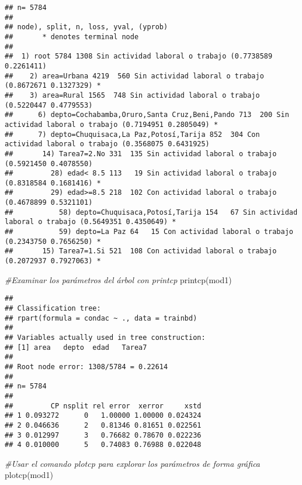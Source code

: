 \documentclass[
]{article}
\newenvironment{Shaded}{\begin{snugshade}}{\end{snugshade}}
\newcommand{\CommentTok}[1]{\textcolor[rgb]{0.56,0.35,0.01}{\textit{#1}}}
\newcommand{\FunctionTok}[1]{\textcolor[rgb]{0.00,0.00,0.00}{#1}}
\newcommand{\NormalTok}[1]{#1}
\begin{document}
\begin{verbatim}
## n= 5784 
## 
## node), split, n, loss, yval, (yprob)
##       * denotes terminal node
## 
##  1) root 5784 1308 Sin actividad laboral o trabajo (0.7738589 0.2261411)  
##    2) area=Urbana 4219  560 Sin actividad laboral o trabajo (0.8672671 0.1327329) *
##    3) area=Rural 1565  748 Sin actividad laboral o trabajo (0.5220447 0.4779553)  
##      6) depto=Cochabamba,Oruro,Santa Cruz,Beni,Pando 713  200 Sin actividad laboral o trabajo (0.7194951 0.2805049) *
##      7) depto=Chuquisaca,La Paz,Potosí,Tarija 852  304 Con actividad laboral o trabajo (0.3568075 0.6431925)  
##       14) Tarea7=2.No 331  135 Sin actividad laboral o trabajo (0.5921450 0.4078550)  
##         28) edad< 8.5 113   19 Sin actividad laboral o trabajo (0.8318584 0.1681416) *
##         29) edad>=8.5 218  102 Con actividad laboral o trabajo (0.4678899 0.5321101)  
##           58) depto=Chuquisaca,Potosí,Tarija 154   67 Sin actividad laboral o trabajo (0.5649351 0.4350649) *
##           59) depto=La Paz 64   15 Con actividad laboral o trabajo (0.2343750 0.7656250) *
##       15) Tarea7=1.Si 521  108 Con actividad laboral o trabajo (0.2072937 0.7927063) *
\end{verbatim}

\begin{Shaded}
\begin{Highlighting}[]
\CommentTok{\#Examinar los parámetros del árbol con printcp}
\FunctionTok{printcp}\NormalTok{(mod1)}
\end{Highlighting}
\end{Shaded}

\begin{verbatim}
## 
## Classification tree:
## rpart(formula = condac ~ ., data = trainbd)
## 
## Variables actually used in tree construction:
## [1] area   depto  edad   Tarea7
## 
## Root node error: 1308/5784 = 0.22614
## 
## n= 5784 
## 
##         CP nsplit rel error  xerror     xstd
## 1 0.093272      0   1.00000 1.00000 0.024324
## 2 0.046636      2   0.81346 0.81651 0.022561
## 3 0.012997      3   0.76682 0.78670 0.022236
## 4 0.010000      5   0.74083 0.76988 0.022048
\end{verbatim}

\begin{Shaded}
\begin{Highlighting}[]
\CommentTok{\#Usar el comando plotcp para explorar los parámetros de forma gráfica}
\FunctionTok{plotcp}\NormalTok{(mod1)}
\end{Highlighting}
\end{Shaded}
\end{document}
